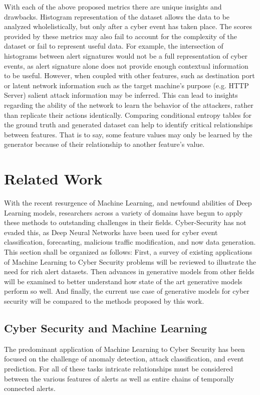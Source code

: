 \documentclass[12pt,american]{report}
\begin{document}
With each of the above proposed metrics there are unique insights and drawbacks. Histogram representation of the dataset allows the data to be analyzed wholelistically, but only after a cyber event has taken place. The scores provided by these metrics may also fail to account for the complexity of the dataset or fail to represent useful data. For example, the intersection of histograms between alert signatures would not be a full representation of cyber events, as alert signature alone does not provide enough contextual information to be useful. However, when coupled with other features, such as destination port or latent network information such as the target machine's purpose (e.g. HTTP Server) salient attack information may be inferred. This can lead to insights regarding the ability of the network to learn the behavior of the attackers, rather than replicate their actions identically. Comparing conditional entropy tables for the ground truth and generated dataset can help to identify critical relationships between features. That is to say, some feature values may only be learned by the generator because of their relationship to another feature's value.

\chapter{Related Work}

With the recent resurgence of Machine Learning, and newfound abilities of Deep Learning models, researchers across a variety of domains have begun to apply these methods to outstanding challenges in their fields. Cyber-Security has not evaded this, as Deep Neural Networks have been used for cyber event classification, forecasting, malicious traffic modification, and now data generation. This section shall be organized as follows: First, a survey of existing applications of Machine Learning to Cyber Security problems will be reviewed to illustrate the need for rich alert datasets. Then advances in generative models from other fields will be examined to better understand how state of the art generative models perform so well. And finally, the current use case of generative models for cyber security will be compared to the methods proposed by this work. 

\section{Cyber Security and Machine Learning}

The predominant application of Machine Learning to Cyber Security has been focused on the challenge of anomaly detection, attack classification, and event prediction. For all of these tasks intricate relationships must be considered between the various features of alerts as well as entire chains of temporally connected alerts. 
\end{document}
